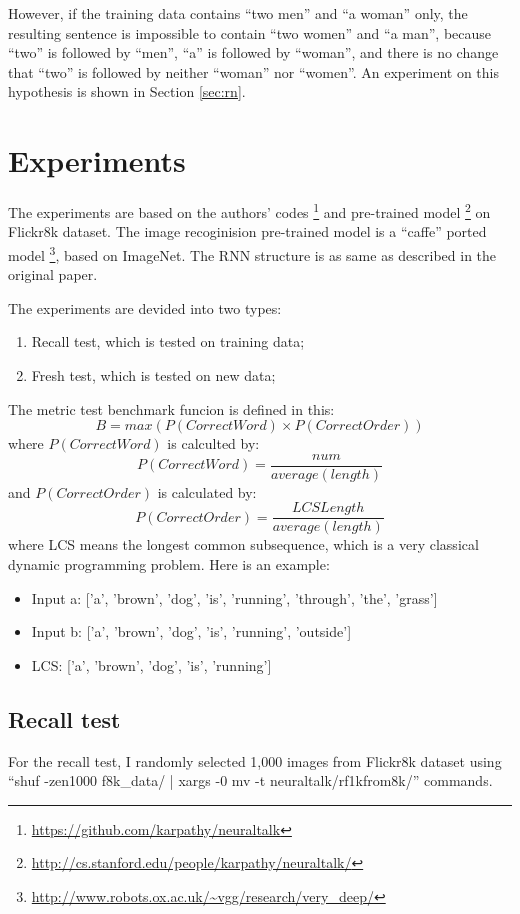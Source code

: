 \documentclass[10pt,twocolumn,letterpaper]{article}
\begin{document}
However, if the training data contains ``two men'' and ``a woman'' only,
the resulting sentence is impossible to contain ``two women'' and ``a man'',
because ``two'' is followed by ``men'', ``a'' is followed by ``woman'',
and there is no change that ``two'' is followed by neither ``woman'' nor ``women''.
An experiment on this hypothesis is shown in Section \ref{sec:rn}.


\section{Experiments}
The experiments are based on the authors' codes \footnote{\url{https://github.com/karpathy/neuraltalk}} and pre-trained model
\footnote{\url{http://cs.stanford.edu/people/karpathy/neuraltalk/}} on Flickr8k dataset.
The image recoginision pre-trained model is a ``caffe'' ported model \footnote{\url{http://www.robots.ox.ac.uk/~vgg/research/very_deep/}}, based on ImageNet.
The RNN structure is as same as described in the original paper.

The experiments are devided into two types:
\begin{enumerate}
    \item Recall test, which is tested on training data;
    \item Fresh test, which is tested on new data;
\end{enumerate}

The metric test benchmark funcion is defined in this:
$$B = max(P(CorrectWord) \times P(CorrectOrder))$$
where $P(CorrectWord)$ is calculted by:
$$P(CorrectWord) = \frac{num}{average(length)}$$
and $P(CorrectOrder)$ is calculated by:
$$P(CorrectOrder) = \frac{LCSLength}{average(length)}$$
where LCS means the longest common subsequence, which is a very classical dynamic programming problem.
Here is an example:
\begin{itemize}
    \item Input a: ['a', 'brown', 'dog', 'is', 'running', 'through', 'the', 'grass']
    \item Input b: ['a', 'brown', 'dog', 'is', 'running', 'outside']
    \item LCS: ['a', 'brown', 'dog', 'is', 'running']
\end{itemize}

\subsection{Recall test}
For the recall test, I randomly selected 1,000 images from Flickr8k dataset using
``shuf -zen1000 f8k\_data/\text{*} | xargs -0 mv -t neuraltalk/rf1kfrom8k/'' commands.
\end{document}
